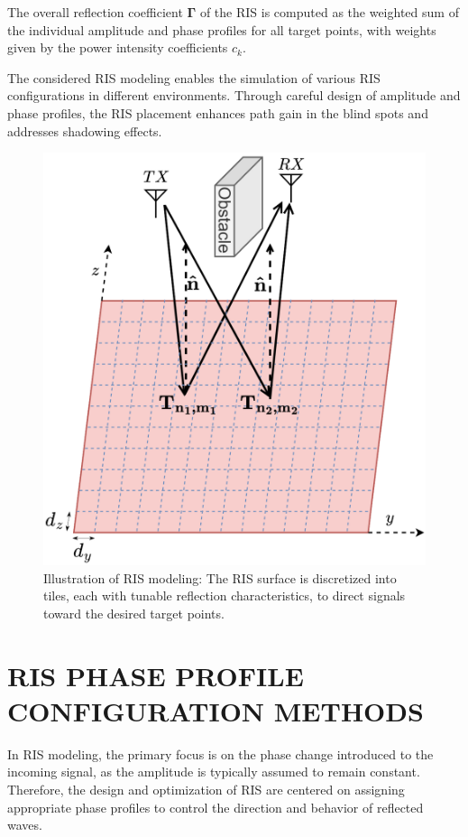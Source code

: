 \documentclass{IEEEoj}
\begin{document}
The overall reflection coefficient $\mathbf{\Gamma}$ of the RIS is computed as the weighted sum of the individual amplitude and phase profiles for all target points, with weights given by the power intensity coefficients $c_k$.

The considered RIS modeling enables the simulation of various RIS configurations in different environments. Through careful design of amplitude and phase profiles, the RIS placement enhances path gain in the blind spots and addresses shadowing effects.

\begin{figure}
	\centering \includegraphics[width=.8\linewidth]{RIS_Modeling.png}
	\caption{Illustration of RIS modeling: The RIS surface is discretized into tiles, each with tunable reflection characteristics, to direct signals toward the desired target points.}
	\label{RIS_Modeling}
\end{figure}

\section{RIS PHASE PROFILE CONFIGURATION METHODS} \label{sec:phase_profile_section}
In RIS modeling, the primary focus is on the phase change introduced to the incoming signal, as the amplitude is typically assumed to remain constant. Therefore, the design and optimization of RIS are centered on assigning appropriate phase profiles to control the direction and behavior of reflected waves.
\end{document}
